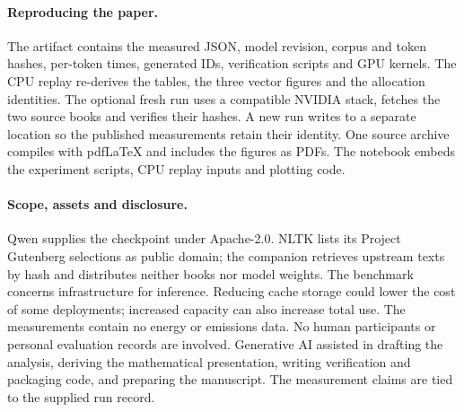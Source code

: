 \paragraph{Reproducing the paper.}
The artifact contains the measured JSON, model revision, corpus and token hashes, per-token times, generated IDs, verification scripts and GPU kernels. The CPU replay re-derives the tables, the three vector figures and the allocation identities. The optional fresh run uses a compatible NVIDIA stack, fetches the two source books and verifies their hashes. A new run writes to a separate location so the published measurements retain their identity. One source archive compiles with pdfLaTeX and includes the figures as PDFs. The notebook embeds the experiment scripts, CPU replay inputs and plotting code.

\paragraph{Scope, assets and disclosure.}
Qwen supplies the checkpoint under Apache-2.0. NLTK lists its Project Gutenberg selections as public domain; the companion retrieves upstream texts by hash and distributes neither books nor model weights. The benchmark concerns infrastructure for inference. Reducing cache storage could lower the cost of some deployments; increased capacity can also increase total use. The measurements contain no energy or emissions data. No human participants or personal evaluation records are involved. Generative AI assisted in drafting the analysis, deriving the mathematical presentation, writing verification and packaging code, and preparing the manuscript. The measurement claims are tied to the supplied run record.
